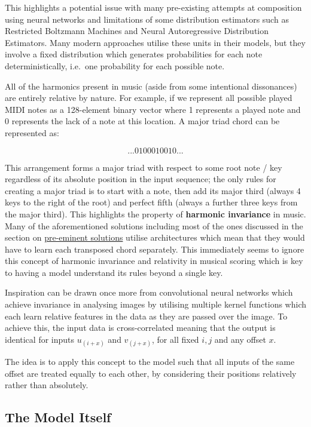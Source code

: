 \documentclass[12pt,]{article}
\begin{document}
This highlights a potential issue with many pre-existing attempts at
composition using neural networks and limitations of some distribution
estimators such as Restricted Boltzmann Machines and Neural
Autoregressive Distribution Estimators. Many modern approaches utilise
these units in their models, but they involve a fixed distribution which
generates probabilities for each note deterministically, i.e.~one
probability for each possible note.

All of the harmonics present in music (aside from some intentional
dissonances) are entirely relative by nature. For example, if we
represent all possible played MIDI notes as a 128-element binary vector
where 1 represents a played note and 0 represents the lack of a note at
this location. A major triad chord can be represented as:

\[... 0100010010 ...\]

This arrangement forms a major triad with respect to some root note /
key regardless of its absolute position in the input sequence; the only
rules for creating a major triad is to start with a note, then add its
major third (always 4 keys to the right of the root) and perfect fifth
(always a further three keys from the major third). This highlights the
property of \textbf{harmonic invariance} in music. Many of the
aforementioned solutions including most of the ones discussed in the
section on \protect\hyperlink{competitiveexistingsolutions}{pre-eminent
solutions} utilise architectures which mean that they would have to
learn each transposed chord separately. This immediately seems to ignore
this concept of harmonic invariance and relativity in musical scoring
which is key to having a model understand its rules beyond a single key.

Inspiration can be drawn once more from convolutional neural networks
which achieve invariance in analysing images by utilising multiple
kernel functions which each learn relative features in the data as they
are passed over the image. To achieve this, the input data is
cross-correlated meaning that the output is identical for inputs
\(u_{(i + x)}\) and \(v_{(j+x)}\), for all fixed \(i,j\) and any offset
\(x\).

The idea is to apply this concept to the model such that all inputs of
the same offset are treated equally to each other, by considering their
positions relatively rather than absolutely.

\hypertarget{the-model-itself}{%
\subsection{The Model Itself}\label{the-model-itself}}
\end{document}
